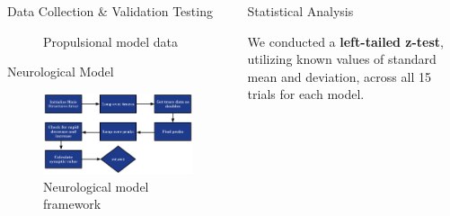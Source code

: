 \documentclass[final, 16pt]{beamer}
\newlength{\colwidth}
\newlength{\twocolwidth}
\begin{document}
\begin{frame}[t]
\begin{columns}[t]
\begin{column}{\twocolwidth}
\begin{multicols}{2}
\begin{block}{Data Collection \& Validation Testing}
\begin{multicols}{2}
\begin{figure}
         \caption{Propulsional model data}
         \label{fig:propulsion-table}
       \end{figure}
      \end{multicols}
  \end{block}
  \begin{block}{Neurological Model}
    \begin{figure}
      \centering
      \vspace*{0.25cm}
       \includegraphics[height=0.65\linewidth, width=0.9\linewidth]{img/Neurological_Model.png}
       \caption{Neurological model framework}
       \label{fig:neurological-model}
     \end{figure}
  \end{block}
\end{multicols}
\end{column}

\separatorcolumn

\begin{column}{\colwidth}
  \begin{block}{Statistical Analysis}
    \vspace*{-1.1cm}

    We conducted a \textbf{left-tailed z-test}, utilizing known values of standard mean and deviation, across all 15 trials for each model.

    \vspace*{-1.1cm}


\end{block}
\end{column}
\end{columns}
\end{frame}
\end{document}
